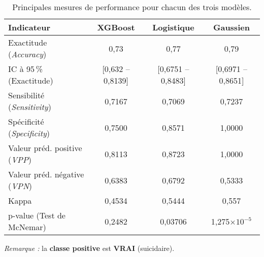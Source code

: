 \begin{table}[H]
	\centering
	\caption{Principales mesures de performance pour chacun des trois modèles.}
	\label{tab:comparaison_mesures}
	\begin{tabular}{p{4.2cm}ccc}
		\toprule
		\textbf{Indicateur} 
		& \textbf{XGBoost} 
		& \textbf{Logistique}
		& \textbf{Gaussien} \\
		\midrule
		Exactitude (\emph{Accuracy})              
		& 0,73          
		& 0,77          
		& 0,79          \\
		IC à 95\,\% (Exactitude)            
		& [0,632 -- 0,8139]
		& [0,6751 -- 0,8483]
		& [0,6971 -- 0,8651] \\
		Sensibilité (\emph{Sensitivity})          
		& 0,7167       
		& 0,7069        
		& 0,7237        \\
		Spécificité (\emph{Specificity})          
		& 0,7500        
		& 0,8571        
		& 1,0000        \\
		Valeur préd. positive (\emph{VPP})        
		& 0,8113        
		& 0,8723        
		& 1,0000        \\
		Valeur préd. négative (\emph{VPN})        
		& 0,6383        
		& 0,6792        
		& 0,5333        \\
		Kappa                                      
		& 0,4534        
		& 0,5444        
		& 0,557         \\
		p-value (Test de McNemar)                  
		& 0,2482        
		& 0,03706       
		& 1,275$\times 10^{-5}$ \\
		\bottomrule
	\end{tabular}
	
	\vspace{1ex}
	\footnotesize
	\textit{Remarque :} la \textbf{classe positive} est \textbf{VRAI} (suicidaire).
\end{table}

